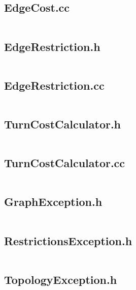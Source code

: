 \documentclass[../main.tex]{subfiles}
\begin{document}
\subsection{EdgeCost.cc}\label{lst:graph-edge-cost-cc}
\inputminted[linenos=true]{cpp}{parts/code/graph/EdgeCost.cc}

\subsection{EdgeRestriction.h}\label{lst:graph-edge-restriction-h}
\inputminted[linenos=true]{cpp}{parts/code/graph/EdgeRestriction.h}

\subsection{EdgeRestriction.cc}\label{lst:graph-edge-restriction-cc}
\inputminted[linenos=true]{cpp}{parts/code/graph/EdgeRestriction.cc}

\subsection{TurnCostCalculator.h}\label{lst:graph-turn-cost-calculator-h}
\inputminted[linenos=true]{cpp}{parts/code/graph/TurnCostCalculator.h}

\subsection{TurnCostCalculator.cc}\label{lst:graph-turn-cost-calculator-cc}
\inputminted[linenos=true]{cpp}{parts/code/graph/TurnCostCalculator.cc}

\subsection{GraphException.h}\label{lst:graph-graph-exception-h}
\inputminted[linenos=true]{cpp}{parts/code/graph/GraphException.h}

\subsection{RestrictionsException.h}\label{lst:graph-restrictions-exception-h}
\inputminted[linenos=true]{cpp}{parts/code/graph/RestrictionsException.h}

\subsection{TopologyException.h}\label{lst:graph-topology-exception-h}
\inputminted[linenos=true]{cpp}{parts/code/graph/TopologyException.h}
\end{document}
